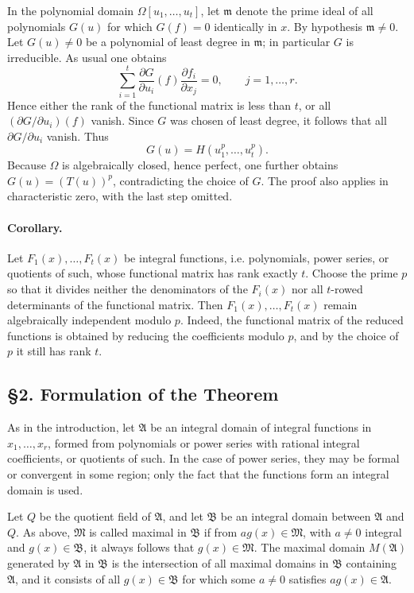 \documentclass[11pt]{article}
\providecommand{\frakA}{\mathfrak A}
\providecommand{\frakB}{\mathfrak B}
\providecommand{\frakM}{\mathfrak M}
\begin{document}
In the polynomial domain \(\Omega[u_1,\ldots,u_t]\), let \(\mathfrak m\) denote the prime ideal of all polynomials \(G(u)\) for which \(G(f)=0\) identically in \(x\). By hypothesis \(\mathfrak m\ne0\). Let \(G(u)\ne0\) be a polynomial of least degree in \(\mathfrak m\); in particular \(G\) is irreducible. As usual one obtains
\[
 \sum_{i=1}^t \frac{\partial G}{\partial u_i}(f)\frac{\partial f_i}{\partial x_j}=0,
        \qquad j=1,\ldots,r .
\]
Hence either the rank of the functional matrix is less than \(t\), or all \((\partial G/\partial u_i)(f)\) vanish. Since \(G\) was chosen of least degree, it follows that all \(\partial G/\partial u_i\) vanish. Thus
\[
        G(u)=H(u_1^p,\ldots,u_t^p).
\]
Because \(\Omega\) is algebraically closed, hence perfect, one further obtains \(G(u)=(T(u))^p\), contradicting the choice of \(G\). The proof also applies in characteristic zero, with the last step omitted.

\paragraph{Corollary.}
Let \(F_1(x),\ldots,F_t(x)\) be integral functions, i.e. polynomials, power series, or quotients of such, whose functional matrix has rank exactly \(t\). Choose the prime \(p\) so that it divides neither the denominators of the \(F_i(x)\) nor all \(t\)-rowed determinants of the functional matrix. Then \(F_1(x),\ldots,F_t(x)\) remain algebraically independent modulo \(p\). Indeed, the functional matrix of the reduced functions is obtained by reducing the coefficients modulo \(p\), and by the choice of \(p\) it still has rank \(t\).

\subsection*{§2. Formulation of the Theorem}

As in the introduction, let \(\frakA\) be an integral domain of integral functions in \(x_1,\ldots,x_r\), formed from polynomials or power series with rational integral coefficients, or quotients of such. In the case of power series, they may be formal or convergent in some region; only the fact that the functions form an integral domain is used.

Let \(Q\) be the quotient field of \(\frakA\), and let \(\frakB\) be an integral domain between \(\frakA\) and \(Q\). As above, \(\frakM\) is called maximal in \(\frakB\) if from \(a g(x)\in\frakM\), with \(a\ne0\) integral and \(g(x)\in\frakB\), it always follows that \(g(x)\in\frakM\). The maximal domain \(M(\frakA)\) generated by \(\frakA\) in \(\frakB\) is the intersection of all maximal domains in \(\frakB\) containing \(\frakA\), and it consists of all \(g(x)\in\frakB\) for which some \(a\ne0\) satisfies \(a g(x)\in\frakA\).
\end{document}
